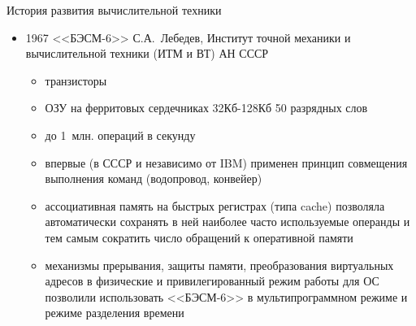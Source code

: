 \documentclass[aspectratio=169,14pt]{beamer}
\begin{document}
\begin{frame}{История развития вычислительной техники}
    \begin{itemize}
        \item 1967 <<БЭСМ-6>> С.А.~Лебедев, Институт точной механики и вычислительной
        техники (ИТМ и ВТ) АН СССР
        \begin{itemize}
            \item транзисторы
            \item ОЗУ на ферритовых сердечниках 32Кб-128Кб 50 разрядных слов
            \item до 1~млн. операций в секунду
            \item впервые (в СССР и независимо от IBM) применен принцип
            совмещения выполнения команд (водопровод, конвейер)
            \item ассоциативная память на быстрых регистрах (типа cache) позволяла
            автоматически сохранять в ней наиболее часто используемые операнды и тем самым сократить число обращений к оперативной памяти
            \item \begin{spacing}{0.9}механизмы прерывания, защиты памяти, преобразования виртуальных
            адресов в физические и привилегированный режим работы для ОС
            позволили использовать <<БЭСМ-6>> в мультипрограммном режиме и режиме разделения времени
            \end{spacing}
        \end{itemize}
    \end{itemize}
\end{frame}
\end{document}
